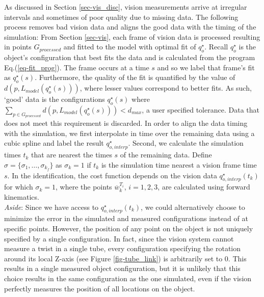 \documentclass[runningheads,a4paper]{llncs}
\begin{document}
As discussed in Section \ref{sec-vis_disc}, vision measurements arrive at irregular intervals and sometimes of poor quality due to missing data.  The following process removes bad vision data and aligns the good data with the timing of the simulation: From Section \ref{sec-vis}, each frame of vision data is processed resulting in points $G_{processed}$ and fitted to the model with optimal fit of $q_o^\star$. Recall $q_o^\star$ is the object's configuration that best fits the data and is calculated from the program Eq.(\ref{eq-fit_prog}). The frame occurs at a time $s$ and so we label that frame's fit as $q_o^\star(s)$.  Furthermore, the quality of the fit is quantified by the value of $d(p,L_{model}(q_o^\star(s)))$, where lesser values correspond to better fits. As such, `good' data is the configurations $q_o^\star(s)$ where $\sum_{p\in G_{processed}}d(p,L_{model}(q_o^\star(s)))<d_{max}$, a user specified tolerance. Data that does not meet this requirement is discarded.  In order to align the data timing with the simulation, we first interpolate in time over the remaining data using a cubic spline and label the result $q_{o,interp}^\star$.  Second, we calculate the simulation times $t_k$ that are nearest the times $s$ of the remaining data. Define $\sigma = \{\sigma_1,\ldots,\sigma_{k_f}\}$ as $\sigma_k = 1$ if $t_k$ is the simulation time nearest a vision frame time $s$.  In the identification, the cost function depends on the vision data $q_{o,interp}^\star(t_k)$ for which $\sigma_k = 1$, where the points $\overline{w}_k^{T_i}$, $i = 1,2,3$, are calculated using forward kinematics.\\[10pt]

\emph{Aside}: Since we have access to $q_{o,interp}^\star(t_k)$, we could alternatively choose to minimize the error in the simulated and measured configurations instead of at specific points. However, the position of any point on the object is not uniquely specified by a single configuration. In fact, since the vision system cannot measure a twist in a single tube, every configuration specifying the rotation around its local Z-axis (see Figure \ref{fig-tube_link}) is arbitrarily set to 0. This results in a single measured object configuration, but it is unlikely that this choice results in the same configuration as the one simulated, even if the vision perfectly measures the position of all locations on the object. \\[10pt]
\end{document}
